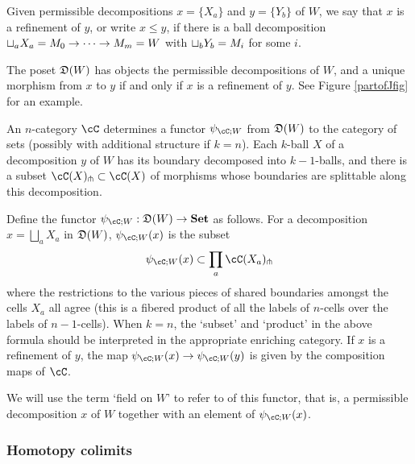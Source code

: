 \documentclass{pnastwo}
\begin{document}
\begin{article}
Given permissible decompositions $x = \{X_a\}$ and $y = \{Y_b\}$ of $W$, we say that $x$ is a refinement
of $y$, or write $x \le y$, if there is a ball decomposition $\sqcup_a X_a = M_0\to\cdots\to M_m = W$
with $\sqcup_b Y_b = M_i$ for some $i$.

\begin{defn}
The poset $\mathfrak{D}(W)$ has objects the permissible decompositions of $W$, 
and a unique morphism from $x$ to $y$ if and only if $x$ is a refinement of $y$.
See Figure \ref{partofJfig} for an example.
\end{defn}


An $n$-category $\cC$ determines 
a functor $\psi_{\cC;W}$ from $\mathfrak{D}(W)$ to the category of sets 
(possibly with additional structure if $k=n$).
Each $k$-ball $X$ of a decomposition $y$ of $W$ has its boundary decomposed into $k{-}1$-balls,
and there is a subset $\cC(X)\spl \sub \cC(X)$ of morphisms whose boundaries
are splittable along this decomposition.

\begin{defn}
Define the functor $\psi_{\cC;W} : \cell(W) \to \Set$ as follows.
For a decomposition $x = \bigsqcup_a X_a$ in $\mathfrak{D}(W)$, $\psi_{\cC;W}(x)$ is the subset
\begin{equation*}
	\psi_{\cC;W}(x) \sub \prod_a \cC(X_a)\spl
\end{equation*}
where the restrictions to the various pieces of shared boundaries amongst the cells
$X_a$ all agree (this is a fibered product of all the labels of $n$-cells over the labels of $n-1$-cells). When $k=n$, the `subset' and `product' in the above formula should be interpreted in the appropriate enriching category.
If $x$ is a refinement of $y$, the map $\psi_{\cC;W}(x) \to \psi_{\cC;W}(y)$ is given by the composition maps of $\cC$.
\end{defn}

We will use the term `field on $W$' to refer to  of this functor,
that is, a permissible decomposition $x$ of $W$ together with an element of $\psi_{\cC;W}(x)$.


\subsubsection{Homotopy colimits}


\end{article}
\end{document}
